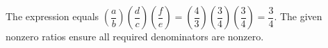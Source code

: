 The expression equals $(\dfrac{a}{b})(\dfrac{d}{c})(\dfrac{f}{e})=(\dfrac{4}{3})(\dfrac{3}{4})(\dfrac{3}{4})=\boxed{\dfrac{3}{4}}$. The given nonzero ratios ensure all required denominators are nonzero.
